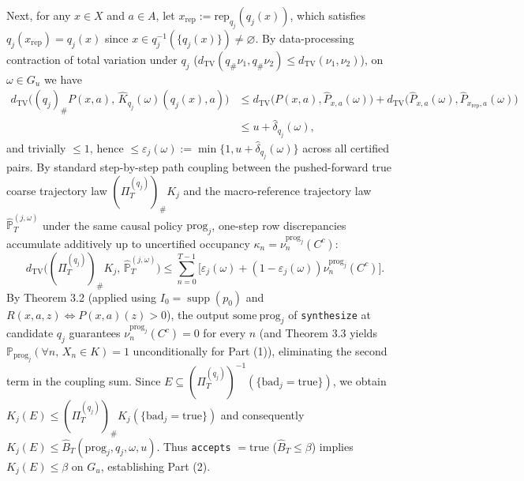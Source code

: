 \documentclass[11pt,a4paper]{article}
\begin{document}
Next, for any \(x \in X\) and \(a \in A\), let
\(x_{\mathrm{rep}} := \mathrm{rep}_{q_j}(q_j(x))\), which satisfies
\(q_j(x_{\mathrm{rep}}) = q_j(x)\) since
\(x \in q_j^{-1}(\{q_j(x)\}) \neq \varnothing\). By data-processing
contraction of total variation under \(q_j\)
(\(d_{\mathrm{TV}}(q_\# \nu_1, q_\# \nu_2) \le d_{\mathrm{TV}}(\nu_1, \nu_2)\)),
on \(\omega \in G_u\) we have \[\begin{aligned}
d_{\mathrm{TV}}\bigl((q_j)_\# P(x,a),\, \widehat{K}_{q_j}(\omega)(q_j(x), a)\bigr)
&\le d_{\mathrm{TV}}\bigl(P(x,a), \widehat{P}_{x,a}(\omega)\bigr) + d_{\mathrm{TV}}\bigl(\widehat{P}_{x,a}(\omega), \widehat{P}_{x_{\mathrm{rep}}, a}(\omega)\bigr) \\
&\le u + \widehat{\delta}_{q_j}(\omega),
\end{aligned}\] and trivially \(\le 1\), hence
\(\le \varepsilon_j(\omega) := \min\{1, u + \widehat{\delta}_{q_j}(\omega)\}\)
across all certified pairs. By standard step-by-step path coupling
between the pushed-forward true coarse trajectory law
\((\Pi_T^{(q_j)})_\# K_j\) and the macro-reference trajectory law
\(\widehat{\mathbb{P}}_T^{(j,\omega)}\) under the same causal policy
\(\mathrm{prog}_j\), one-step row discrepancies accumulate additively up
to uncertified occupancy \(\kappa_n = \nu_n^{\mathrm{prog}_j}(C^c)\):
\[d_{\mathrm{TV}}\bigl((\Pi_T^{(q_j)})_\# K_j,\, \widehat{\mathbb{P}}_T^{(j,\omega)}\bigr) \le \sum_{n=0}^{T-1} \bigl[\varepsilon_j(\omega) + (1 - \varepsilon_j(\omega))\nu_n^{\mathrm{prog}_j}(C^c)\bigr].\]
By Theorem 3.2 (applied using \(I_0 = \operatorname{supp}(p_0)\) and
\(R(x,a,z) \iff P(x,a)(z) > 0\)), the output \(\mathrm{some\ prog}_j\)
of \texttt{synthesize} at candidate \(q_j\) guarantees
\(\nu_n^{\mathrm{prog}_j}(C^c) = 0\) for every \(n\) (and Theorem 3.3
yields \(\mathbb{P}_{\mathrm{prog}_j}(\forall n,\, X_n \in K) = 1\)
unconditionally for Part (1)), eliminating the second term in the
coupling sum. Since
\(E \subseteq (\Pi_T^{(q_j)})^{-1}(\{\mathrm{bad}_j = \mathrm{true}\})\),
we obtain
\(K_j(E) \le (\Pi_T^{(q_j)})_\# K_j(\{\mathrm{bad}_j = \mathrm{true}\})\)
and consequently
\(K_j(E) \le \widehat{B}_T(\mathrm{prog}_j, q_j, \omega, u)\). Thus
\texttt{accepts} \(= \mathrm{true}\) (\(\widehat{B}_T \le \beta\))
implies \(K_j(E) \le \beta\) on \(G_u\), establishing Part (2).
\end{document}
